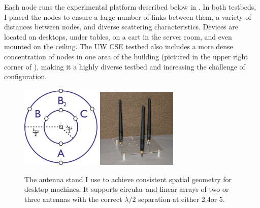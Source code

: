 Each node runs the experimental platform described below in . In both testbeds, I placed the nodes to ensure a large number of links between them, a variety of distances between nodes, and diverse scattering characteristics. Devices are located on desktops, under tables, on a cart in the server room, and even mounted on the ceiling. The UW CSE testbed also includes a more dense concentration of nodes in one area of the building (pictured in the upper right corner of ), making it a highly diverse testbed and increasing the challenge of configuration.

\begin{figure}[ht]
	\centering
	\includegraphics[width=1.5in]{figures/tool/rpsma_dual_632_single_lines.pdf}%
	\hspace{1in}
	\includegraphics[height=1.5in,width=1.5in]{figures/tool/antennas.jpg}
	\caption[A custom antenna stand used to achieve consistent spatial geometry]{\label{fig:antenna_stand}The antenna stand I use to achieve consistent spatial geometry for desktop machines. It supports circular and linear arrays of two or three antennas with the correct $\lambda/2$ separation at either 2.4\GHz or 5\GHz.}
\end{figure}
